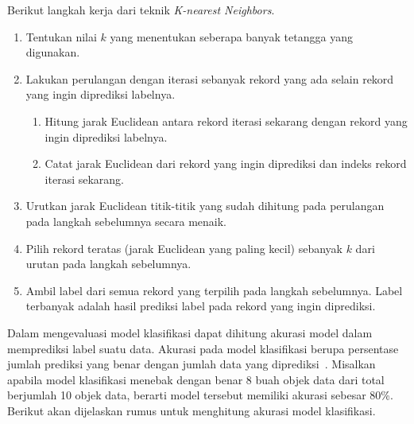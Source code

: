 Berikut langkah kerja dari teknik \textit{K-nearest Neighbors}.
\begin{enumerate}
	\item Tentukan nilai \(k\) yang menentukan seberapa banyak tetangga yang digunakan.
	\item Lakukan perulangan dengan iterasi sebanyak rekord yang ada selain rekord yang ingin diprediksi labelnya.
	\begin{enumerate}
		\item Hitung jarak Euclidean antara rekord iterasi sekarang dengan rekord yang ingin diprediksi labelnya.
		\item Catat jarak Euclidean dari rekord yang ingin diprediksi dan indeks rekord iterasi sekarang.
	\end{enumerate}
	\item Urutkan jarak Euclidean titik-titik yang sudah dihitung pada perulangan pada langkah sebelumnya secara menaik.
	\item Pilih rekord teratas (jarak Euclidean yang paling kecil) sebanyak \(k\) dari urutan pada langkah sebelumnya.
	\item Ambil label dari semua rekord yang terpilih pada langkah sebelumnya. Label terbanyak adalah hasil prediksi label pada rekord yang ingin diprediksi.
\end{enumerate}

Dalam mengevaluasi model klasifikasi dapat dihitung akurasi model dalam memprediksi label suatu data. Akurasi pada model klasifikasi berupa persentase jumlah prediksi yang benar dengan jumlah data yang diprediksi~\cite{jiawei:12:datmin}. Misalkan apabila model klasifikasi menebak dengan benar 8 buah objek data dari total berjumlah 10 objek data, berarti model tersebut memiliki akurasi sebesar 80\%. Berikut akan dijelaskan rumus untuk menghitung akurasi model klasifikasi.

